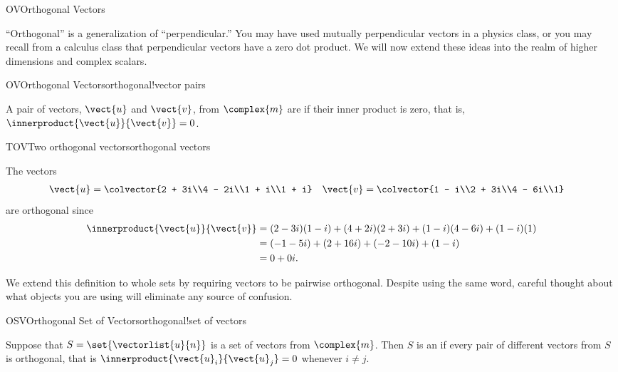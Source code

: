 %
\begin{subsect}{OV}{Orthogonal Vectors}
%
\begin{para}``Orthogonal'' is a generalization of ``perpendicular.''  You may have used mutually perpendicular vectors in a physics class, or you may recall from a calculus class that perpendicular vectors have a zero dot product.  We will now extend these ideas into the realm of higher dimensions and complex scalars.\end{para}
%
%
\begin{definition}{OV}{Orthogonal Vectors}{orthogonal!vector pairs}
\begin{para}A pair of vectors, $\vect{u}$ and $\vect{v}$, from $\complex{m}$ are  if their inner product is zero, that is, $\innerproduct{\vect{u}}{\vect{v}}=0$.\end{para}
\end{definition}
%
%
\begin{example}{TOV}{Two orthogonal vectors}{orthogonal vectors}
\begin{para}The vectors
%
\begin{align*}
\vect{u}&=\colvector{2 + 3i\\4 - 2i\\1 + i\\1 + i}
&
\vect{v}&=\colvector{1 - i\\2 + 3i\\4 - 6i\\1}
\end{align*}
%
are orthogonal since
%
\begin{align*}
\innerproduct{\vect{u}}{\vect{v}}
&=(2-3i)(1-i)+(4+2i)(2+3i)+(1-i)(4-6i)+(1-i)(1)\\
&=(-1-5i)+(2+16i)+(-2-10i)+(1-i)\\
&=0+0i.
\end{align*}\end{para}
%
\end{example}
%
\begin{para}We extend this definition to whole sets by requiring vectors to be pairwise orthogonal.  Despite using the same word, careful thought about what objects you are using will eliminate any source of confusion.\end{para}
%
\begin{definition}{OSV}{Orthogonal Set of Vectors}{orthogonal!set of vectors}
\begin{para}Suppose that $S=\set{\vectorlist{u}{n}}$ is a set of vectors from $\complex{m}$.  Then $S$ is an  if every pair of different vectors from $S$ is orthogonal, that is $\innerproduct{\vect{u}_i}{\vect{u}_j}=0$ whenever $i\neq j$.\end{para}

\end{definition}
\end{subsect}
